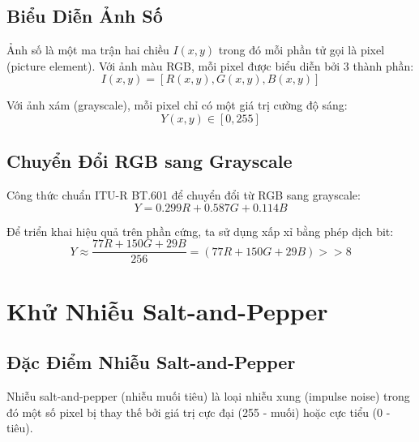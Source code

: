 \documentclass[12pt,a4paper]{report}
\begin{document}
\subsection{Biểu Diễn Ảnh Số}
Ảnh số là một ma trận hai chiều $I(x,y)$ trong đó mỗi phần tử gọi là pixel (picture element). Với ảnh màu RGB, mỗi pixel được biểu diễn bởi 3 thành phần:
\begin{equation}
    I(x,y) = [R(x,y), G(x,y), B(x,y)]
\end{equation}

Với ảnh xám (grayscale), mỗi pixel chỉ có một giá trị cường độ sáng:
\begin{equation}
    Y(x,y) \in [0, 255]
\end{equation}

\subsection{Chuyển Đổi RGB sang Grayscale}
Công thức chuẩn ITU-R BT.601 để chuyển đổi từ RGB sang grayscale:
\begin{equation}
    Y = 0.299R + 0.587G + 0.114B
\end{equation}

Để triển khai hiệu quả trên phần cứng, ta sử dụng xấp xỉ bằng phép dịch bit:
\begin{equation}
    Y \approx \frac{77R + 150G + 29B}{256} = (77R + 150G + 29B) >> 8
\end{equation}

\section{Khử Nhiễu Salt-and-Pepper}

\subsection{Đặc Điểm Nhiễu Salt-and-Pepper}
Nhiễu salt-and-pepper (nhiễu muối tiêu) là loại nhiễu xung (impulse noise) trong đó một số pixel bị thay thế bởi giá trị cực đại (255 - muối) hoặc cực tiểu (0 - tiêu).
\end{document}
